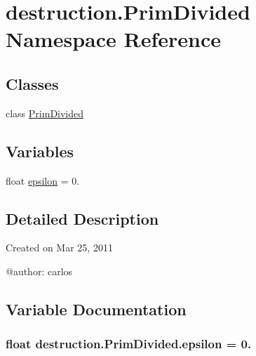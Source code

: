 \hypertarget{namespacedestruction_1_1_prim_divided}{\section{destruction.\-Prim\-Divided Namespace Reference}
\label{namespacedestruction_1_1_prim_divided}
}
\subsection*{Classes}
\begin{DoxyCompactItemize}
\item 
class \hyperlink{classdestruction_1_1_prim_divided_1_1_prim_divided}{Prim\-Divided}
\end{DoxyCompactItemize}
\subsection*{Variables}
\begin{DoxyCompactItemize}
\item 
float \hyperlink{namespacedestruction_1_1_prim_divided_ae82ff18f2e9dede90630cdf047b380a4}{epsilon} = 0.
\end{DoxyCompactItemize}


\subsection{Detailed Description}
\begin{DoxyVerb}Created on Mar 25, 2011

@author: carlos
\end{DoxyVerb}
 

\subsection{Variable Documentation}
\hypertarget{namespacedestruction_1_1_prim_divided_ae82ff18f2e9dede90630cdf047b380a4}{
\subsubsection[{epsilon}]{\setlength{\rightskip}{0pt plus 5cm}float destruction.\-Prim\-Divided.\-epsilon = 0.}}\label{namespacedestruction_1_1_prim_divided_ae82ff18f2e9dede90630cdf047b380a4}
